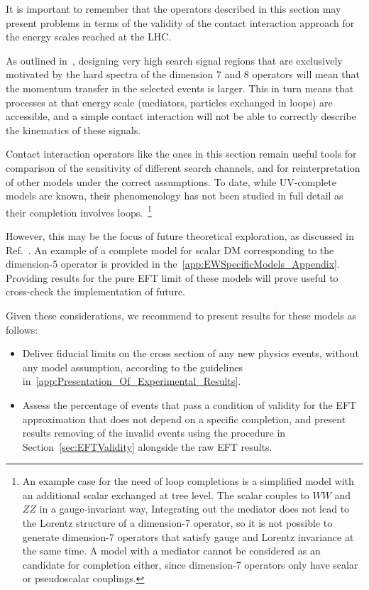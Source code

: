 It is important to remember that the operators described in 
this section may present problems in terms of the validity of the contact interaction
approach for the energy scales reached at the LHC. 

As outlined in~\cite{Berlin:2014cfa}, designing very high \MET search signal regions
that are exclusively motivated by the hard \MET spectra of the dimension 7 and 8 operators
will mean that the momentum transfer in the selected events is larger. This in turn
means that processes at that energy scale (mediators, particles exchanged in loops)
are accessible, and a simple contact interaction will not be able to correctly
describe the kinematics of these signals. 

Contact interaction operators like the ones in this section 
remain useful tools for comparison of the sensitivity of different search channels, 
and for reinterpretation of other models under the correct assumptions. 
To date, while UV-complete models are known, their phenomenology has
not been studied in full detail as their completion involves loops.~\footnote{
An example case for the need of loop completions is a simplified model with an additional scalar exchanged at tree level.
The scalar couples to $WW$ and $ZZ$ in a gauge-invariant way, Integrating out the mediator 
does not lead to the Lorentz structure of a dimension-7 operator, so it is not possible
to generate dimension-7 operators that satisfy gauge and Lorentz invariance at the same time.
A model with a \spinone mediator cannot be considered as an candidate for completion either, since dimension-7 operators only have scalar or pseudoscalar couplings.} 

However, this may be the focus of future theoretical exploration, as discussed in Ref.~\cite{Crivellin:2015wva}.
An example of a complete model 
for scalar DM corresponding to the dimension-5 operator 
is provided in the~\ref{app:EWSpecificModels_Appendix}.
Providing results for the pure EFT limit of these models will prove useful
to cross-check the implementation of future. 

Given these considerations, we recommend to present results 
for these models as follows: 

\begin{itemize}
\item Deliver fiducial limits on the cross section of any new physics events, without any model assumption, according to the guidelines in~\ref{app:Presentation_Of_Experimental_Results}.  
\item Assess the percentage of events that pass a condition of validity for the EFT approximation that does not
depend on a specific completion, and present results removing 
of the invalid events using the procedure in Section~\ref{sec:EFTValidity} alongside the raw EFT results.
\end{itemize}


